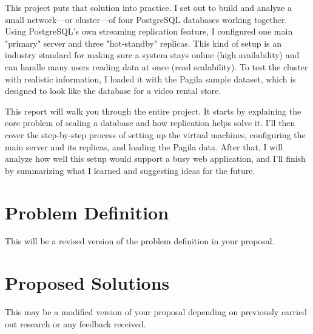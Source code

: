 \documentclass[conference]{IEEEtran}
\begin{document}
This project puts that solution into practice. I set out to build and analyze a small network—or cluster—of four PostgreSQL databases working together. Using PostgreSQL's own streaming replication feature, I configured one main "primary" server and three "hot-standby" replicas. This kind of setup is an industry standard for making sure a system stays online (high availability) and can handle many users reading data at once (read scalability). To test the cluster with realistic information, I loaded it with the Pagila sample dataset, which is designed to look like the database for a video rental store.

This report will walk you through the entire project. It starts by explaining the core problem of scaling a database and how replication helps solve it. I'll then cover the step-by-step process of setting up the virtual machines, configuring the main server and its replicas, and loading the Pagila data. After that, I will analyze how well this setup would support a busy web application, and I'll finish by summarizing what I learned and suggesting ideas for the future.
\section{Problem Definition}
This will be a revised version of the problem definition in your proposal.


%
%


\section{Proposed Solutions}
This may be a modified version of your proposal depending on previously carried out research or any feedback received.  
\end{document}
